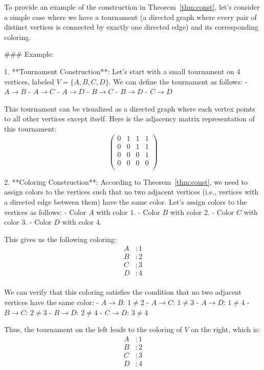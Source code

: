 To provide an example of the construction in Theorem~\ref{thm:const}, let's consider a simple case where we have a tournament (a directed graph where every pair of distinct vertices is connected by exactly one directed edge) and its corresponding coloring.

### Example:

1. **Tournament Construction**:
   Let's start with a small tournament on 4 vertices, labeled \( V = \{A, B, C, D\} \). We can define the tournament as follows:
   - \( A \rightarrow B \)
   - \( A \rightarrow C \)
   - \( A \rightarrow D \)
   - \( B \rightarrow C \)
   - \( B \rightarrow D \)
   - \( C \rightarrow D \)

   This tournament can be visualized as a directed graph where each vertex points to all other vertices except itself. Here is the adjacency matrix representation of this tournament:
   \[
   \begin{pmatrix}
   0 & 1 & 1 & 1 \\
   0 & 0 & 1 & 1 \\
   0 & 0 & 0 & 1 \\
   0 & 0 & 0 & 0 \\
   \end{pmatrix}
   \]

2. **Coloring Construction**:
   According to Theorem~\ref{thm:const}, we need to assign colors to the vertices such that no two adjacent vertices (i.e., vertices with a directed edge between them) have the same color. Let's assign colors to the vertices as follows:
   - Color \( A \) with color 1.
   - Color \( B \) with color 2.
   - Color \( C \) with color 3.
   - Color \( D \) with color 4.

   This gives us the following coloring:
   \[
   \begin{aligned}
   A & : 1 \\
   B & : 2 \\
   C & : 3 \\
   D & : 4 \\
   \end{aligned}
   \]

   We can verify that this coloring satisfies the condition that no two adjacent vertices have the same color:
   - \( A \rightarrow B \): \( 1 \neq 2 \)
   - \( A \rightarrow C \): \( 1 \neq 3 \)
   - \( A \rightarrow D \): \( 1 \neq 4 \)
   - \( B \rightarrow C \): \( 2 \neq 3 \)
   - \( B \rightarrow D \): \( 2 \neq 4 \)
   - \( C \rightarrow D \): \( 3 \neq 4 \)

Thus, the tournament on the left leads to the coloring of \( V \) on the right, which is:
\[
\boxed{
\begin{aligned}
A & : 1 \\
B & : 2 \\
C & : 3 \\
D & : 4 \\
\end{aligned}
}
\]